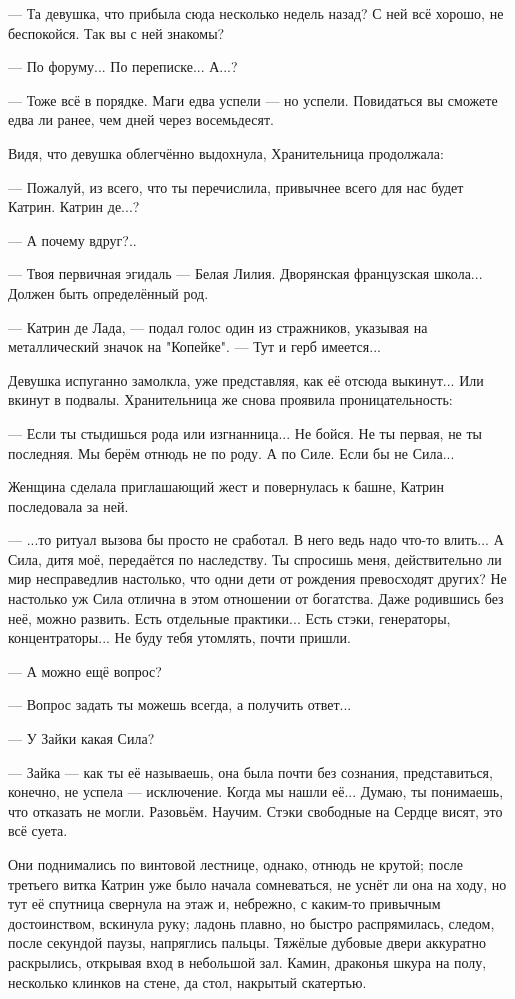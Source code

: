 --- Та девушка, что прибыла сюда несколько недель назад? С ней всё хорошо, не беспокойся. Так вы с ней знакомы?

--- По форуму... По переписке... А...?

--- Тоже всё в порядке. Маги едва успели --- но успели. Повидаться вы сможете едва ли ранее, чем дней через восемьдесят.

\emptypar

Видя, что девушка облегчённо выдохнула, Хранительница продолжала:

--- Пожалуй, из всего, что ты перечислила, привычнее всего для нас будет Катрин. Катрин де...?

--- А почему вдруг?..

--- Твоя первичная эгидаль --- Белая Лилия. Дворянская французская школа... Должен быть определённый род.

--- Катрин де Лада, --- подал голос один из стражников, указывая на металлический значок на "Копейке". --- Тут и герб имеется...

Девушка испуганно замолкла, уже представляя, как её отсюда выкинут... Или вкинут в подвалы.
Хранительница же снова проявила проницательность:

--- Если ты стыдишься рода или изгнанница... Не бойся. Не ты первая, не ты последняя. Мы берём отнюдь не по роду.
А по Силе. Если бы не Сила...

Женщина сделала приглашающий жест и повернулась к башне, Катрин последовала за ней.

--- ...то ритуал вызова бы просто не сработал. В него ведь надо что-то влить...
А Сила, дитя моё, передаётся по наследству.
Ты спросишь меня, действительно ли мир несправедлив настолько, что одни дети от рождения превосходят других?
Не настолько уж Сила отлична в этом отношении от богатства. Даже родившись без неё, можно развить.
Есть отдельные практики... Есть стэки, генераторы, концентраторы... Не буду тебя утомлять, почти пришли.

--- А можно ещё вопрос?

--- Вопрос задать ты можешь всегда, а получить ответ...

--- У Зайки какая Сила?

--- Зайка --- как ты её называешь, она была почти без сознания, представиться, конечно, не успела --- исключение.
Когда мы нашли её... Думаю, ты понимаешь, что отказать не могли. Разовьём.
Научим. Стэки свободные на Сердце висят, это всё суета.

Они поднимались по винтовой лестнице, однако, отнюдь не крутой; после третьего витка Катрин уже было начала сомневаться,
не уснёт ли она на ходу, но тут её спутница свернула на этаж и, небрежно, с каким-то привычным достоинством, вскинула руку;
ладонь плавно, но быстро распрямилась, следом, после секундой паузы, напряглись пальцы.
Тяжёлые дубовые двери аккуратно раскрылись, открывая вход в небольшой зал.
Камин, драконья шкура на полу, несколько клинков на стене, да стол, накрытый скатертью.


